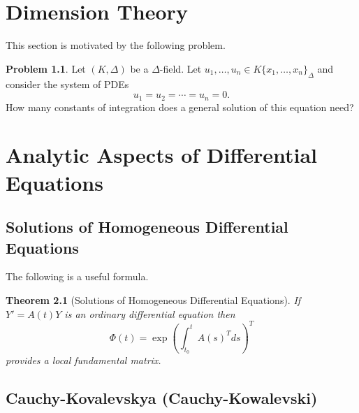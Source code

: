 \documentclass[12pt]{book}
\numberwithin{equation}{section}
\newtheorem{theorem}{Theorem}[subsection]
\theoremstyle{definition}
\newtheorem{problem}[theorem]{Problem}
\theoremstyle{remark}
\begin{document}
\chapter[Dimension Theory]{Dimension Theory}\label{S:dimension-theory}

This section is motivated by the following problem.
\begin{problem}
	Let $(K,\Delta)$ be a $\Delta$-field. 
	Let $u_1,\ldots,u_n \in K\lbrace x_1,\ldots,x_n\rbrace_{\Delta}$ and consider the system of PDEs
	 $$ u_1=u_2=\cdots=u_n=0. $$
	How many constants of integration does a general solution of this equation need?
\end{problem}



\appendix 

\chapter[Analytic Aspects]{Analytic Aspects of Differential Equations}

\section{Solutions of Homogeneous Differential Equations}
The following is a useful formula.
\begin{theorem}[Solutions of Homogeneous Differential Equations]\label{T:solutions}
	If $Y'= A(t)Y$ is an ordinary differential equation then 
	 $$ \Phi(t) = \exp( \int_{t_0}^t A(s)^T ds )^T $$
	provides a local fundamental matrix. 
\end{theorem}



\section{Cauchy-Kovalevskya (Cauchy-Kowalevski)}
\end{document}
